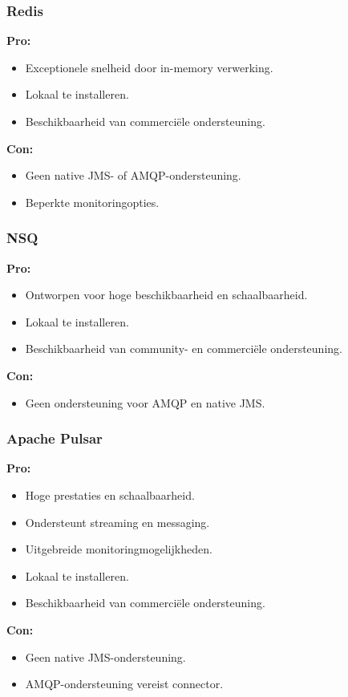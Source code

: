 \subsubsection{Redis}
\textbf{Pro:}
\begin{itemize}
    \item Exceptionele snelheid door in-memory verwerking.
    \item Lokaal te installeren.
    \item Beschikbaarheid van commerciële ondersteuning.
\end{itemize}
\textbf{Con:}
\begin{itemize}
    \item Geen native JMS- of AMQP-ondersteuning.
    \item Beperkte monitoringopties.
\end{itemize}

\subsubsection{NSQ}
\textbf{Pro:}
\begin{itemize}
    \item Ontworpen voor hoge beschikbaarheid en schaalbaarheid.
    \item Lokaal te installeren.
    \item Beschikbaarheid van community- en commerciële ondersteuning.
\end{itemize}
\textbf{Con:}
\begin{itemize}
    \item Geen ondersteuning voor AMQP en native JMS.
\end{itemize}

\subsubsection{Apache Pulsar}
\textbf{Pro:}
\begin{itemize}
    \item Hoge prestaties en schaalbaarheid.
    \item Ondersteunt streaming en messaging.
    \item Uitgebreide monitoringmogelijkheden.
    \item Lokaal te installeren.
    \item Beschikbaarheid van commerciële ondersteuning.
\end{itemize}
\textbf{Con:}
\begin{itemize}
    \item Geen native JMS-ondersteuning.
    \item AMQP-ondersteuning vereist connector.
\end{itemize}

